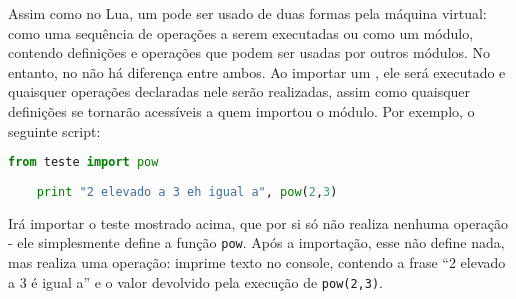     Assim como no Lua, um \script{} pode ser usado de duas formas pela máquina virtual:
    como uma sequência de operações a serem executadas ou como um módulo, contendo definições
    e operações que podem ser usadas por outros módulos. No entanto, no  não há diferença
    entre ambos. Ao importar um \script{} , ele será executado e quaisquer operações
    declaradas nele serão realizadas, assim como quaisquer definições se tornarão acessíveis
    a quem importou o módulo. Por exemplo, o seguinte script:
    \begin{lstlisting}[language=python]
    from teste import pow
    
    print "2 elevado a 3 eh igual a", pow(2,3)
    \end{lstlisting}
    Irá importar o \script{} teste mostrado acima, que por si só não realiza nenhuma operação -
    ele simplesmente define a função \texttt{pow}. Após a importação, esse \script{} não
    define nada, mas realiza uma operação: imprime texto no console, contendo a frase
    ``2 elevado a 3 é igual a'' e o valor devolvido pela execução de \texttt{pow(2,3)}.
    
